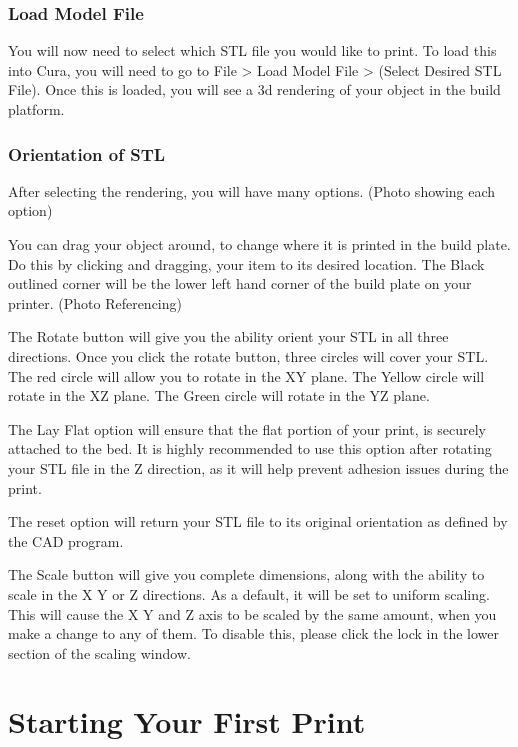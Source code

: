 \subsubsection{Load Model File}

You will now need to select which STL file you would like to print. To load this into Cura, you will need to go to File > Load Model File > (Select Desired STL File). Once this is loaded, you will see a 3d rendering of your object in the build platform. 

\subsubsection{Orientation of STL}

After selecting the rendering, you will have many options. (Photo showing each option) 

You can drag your object around, to change where it is printed in the build plate. Do this by clicking and dragging, your item to its desired location. The Black outlined corner will be the lower left hand corner of the build plate on your printer. (Photo Referencing)

The Rotate button will give you the ability orient your STL in all three directions. Once you click the rotate button, three circles will cover your STL. The red circle will allow you to rotate in the XY plane. The Yellow circle will rotate in the XZ plane. The Green circle will rotate in the YZ plane. 

The Lay Flat option will ensure that the flat portion of your print, is securely attached to the bed. It is highly recommended to use this option after rotating your STL file in the Z direction, as it will help prevent adhesion issues during the print.

The reset option will return your STL file to its original orientation as defined by the CAD program. 

The Scale button will give you complete dimensions, along with the ability to scale in the X Y or Z directions. As a default, it will be set to uniform scaling. This will cause the X Y and Z axis to be scaled by the same amount, when you make a change to any of them. To disable this, please click the lock in the lower section of the scaling window.

\section{Starting Your First Print}

